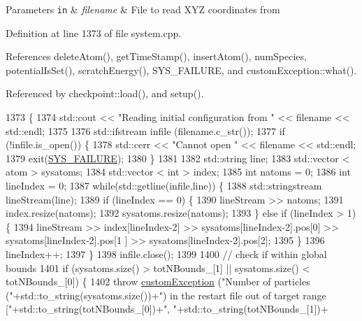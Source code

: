 \begin{DoxyParams}[1]{Parameters}
\mbox{\tt in}  & {\em filename} & File to read X\-Y\-Z coordinates from \\
\hline
\end{DoxyParams}


Definition at line 1373 of file system.\-cpp.



References delete\-Atom(), get\-Time\-Stamp(), insert\-Atom(), num\-Species, potential\-Is\-Set(), scratch\-Energy(), S\-Y\-S\-\_\-\-F\-A\-I\-L\-U\-R\-E, and custom\-Exception\-::what().



Referenced by checkpoint\-::load(), and setup().


\begin{DoxyCode}
1373                                               \{
1374     std::cout << \textcolor{stringliteral}{"Reading initial configuration from "} << filename << std::endl;
1375 
1376     std::ifstream infile (filename.c\_str());
1377     \textcolor{keywordflow}{if} (!infile.is\_open()) \{
1378         std::cerr << \textcolor{stringliteral}{"Cannot open "} << filename << std::endl;
1379         exit(\hyperlink{global_8h_a428dfe1ef0a6ff4b1fdebf275f6aff2e}{SYS\_FAILURE});
1380     \}
1381 
1382     std::string line;
1383     std::vector < atom > sysatoms;
1384     std::vector < int > index;
1385     \textcolor{keywordtype}{int} natoms = 0;
1386     \textcolor{keywordtype}{int} lineIndex = 0;
1387     \textcolor{keywordflow}{while}(std::getline(infile,line)) \{
1388         std::stringstream lineStream(line);
1389         \textcolor{keywordflow}{if} (lineIndex == 0) \{
1390             lineStream >> natoms;
1391             index.resize(natoms);
1392             sysatoms.resize(natoms);
1393         \} \textcolor{keywordflow}{else} \textcolor{keywordflow}{if} (lineIndex > 1) \{
1394             lineStream >> index[lineIndex-2] >> sysatoms[lineIndex-2].pos[0] >> sysatoms[lineIndex-2].pos[1
      ] >> sysatoms[lineIndex-2].pos[2];
1395         \}
1396         lineIndex++;
1397     \}
1398     infile.close();
1399 
1400     \textcolor{comment}{// check if within global bounds}
1401     \textcolor{keywordflow}{if} (sysatoms.size() > totNBounds\_[1] || sysatoms.size() < totNBounds\_[0]) \{
1402         \textcolor{keywordflow}{throw} \hyperlink{classcustom_exception}{customException} (\textcolor{stringliteral}{"Number of particles ("}+std::to\_string(sysatoms.size())+\textcolor{stringliteral}{") in
       the restart file out of target range ["}+std::to\_string(totNBounds\_[0])+\textcolor{stringliteral}{", "}+std::to\_string(totNBounds\_[1])+\textcolor{stringliteral}{
}
\end{DoxyCode}
